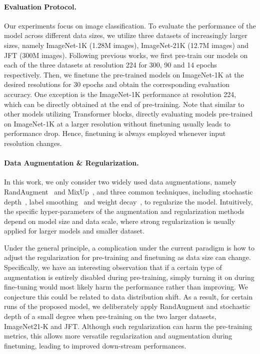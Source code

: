 \documentclass{article}
\begin{document}
\paragraph{Evaluation Protocol.} Our experiments focus on image classification. 
To evaluate the performance of the model across different data sizes, we utilize three datasets of increasingly larger sizes, namely ImageNet-1K (1.28M images), ImageNet-21K (12.7M images) and JFT (300M images).
Following previous works, we first pre-train our models on each of the three datasets at resolution 224 for 300, 90 and 14 epochs respectively.
Then, we finetune the pre-trained models on ImageNet-1K at the desired resolutions for 30 epochs and obtain the corresponding evaluation accuracy.
One exception is the ImageNet-1K performance at resolution 224, which can be directly obtained at the end of pre-training.
Note that similar to other models utilizing Transformer blocks, directly evaluating models pre-trained on ImageNet-1K at a larger resolution without finetuning usually leads to performance drop.
Hence, finetuning is always employed whenever input resolution changes.

\paragraph{Data Augmentation \& Regularization.} In this work, we only consider two widely used data augmentations, namely RandAugment~\cite{cubuk2020randaugment} and MixUp~\cite{zhang2017mixup}, and three common techniques, including stochastic depth~\cite{huang2016deep}, label smoothing~\cite{szegedy2016rethinking} and weight decay~\cite{loshchilov2017decoupled}, to regularize the model.
Intuitively, the specific hyper-parameters of the augmentation and regularization methods depend on model size and data scale, where strong regularization is usually applied for larger models and smaller dataset.

Under the general principle, a complication under the current paradigm is how to adjust the regularization for pre-training and finetuning as data size can change.
Specifically, we have an interesting observation that if a certain type of augmentation is entirely disabled during pre-training, simply turning it on during fine-tuning would most likely harm the performance rather than improving.
We conjecture this could be related to data distribution shift.
As a result, for certain runs of the proposed model, we deliberately apply RandAugment and stochastic depth of a small degree when pre-training on the two larger datasets, ImageNet21-K and JFT.
Although such regularization can harm the pre-training metrics, this allows more versatile regularization and augmentation during finetuning, leading to improved down-stream performances.
\end{document}
